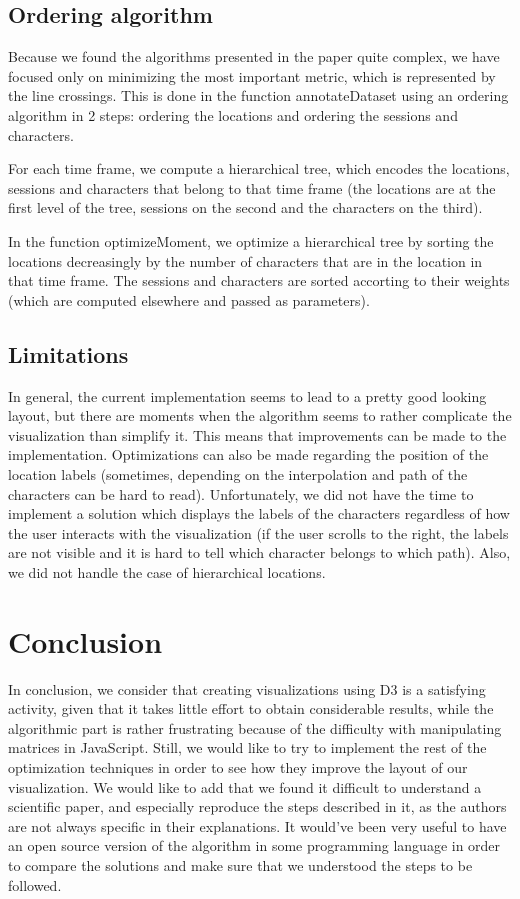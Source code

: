 \documentclass{report}
\begin{document}
\section{Ordering algorithm}
\par
Because we found the algorithms presented in the paper quite complex, we have focused only on minimizing the most important metric, which is represented by the line crossings. This is done in the function annotateDataset using an ordering algorithm in 2 steps: ordering the locations and ordering the sessions and characters.
\par For each time frame, we compute a hierarchical tree, which encodes the locations, sessions and characters that belong to that time frame (the locations are at the first level of the tree, sessions on the second and the characters on the third).
\par
In the function optimizeMoment, we optimize a hierarchical tree by sorting the locations decreasingly by the number of characters that are in the location in that time frame. The sessions and characters are sorted accorting to their weights (which are computed elsewhere and passed as parameters).
\par
\section{Limitations}
In general, the current implementation seems to lead to a pretty good looking layout, but there are moments when the algorithm seems to rather complicate the visualization than simplify it. This means that improvements can be made to the implementation.
Optimizations can also be made regarding the position of the location labels (sometimes, depending on the interpolation and path of the characters can be hard to read). Unfortunately, we did not have the time to implement a solution which displays the labels of the characters regardless of how the user interacts with the visualization (if the user scrolls to the right, the labels are not visible and it is hard to tell which character belongs to which path).
Also, we did not handle the case of hierarchical locations.

\chapter{Conclusion}
\par
In conclusion, we consider that creating visualizations using D3 is a satisfying activity, given that it takes little effort to obtain considerable results, while the algorithmic part is rather frustrating because of the difficulty with manipulating matrices in JavaScript. Still, we would like to try to implement the rest of the optimization techniques in order to see how they improve the layout of our visualization. We would like to add that we found it difficult to understand a scientific paper, and especially reproduce the steps described in it, as the authors are not always specific in their explanations. It would've been very useful to have an open source version of the algorithm in some programming language in order to compare the solutions and make sure that we understood the steps to be followed.

  

\end{document}
